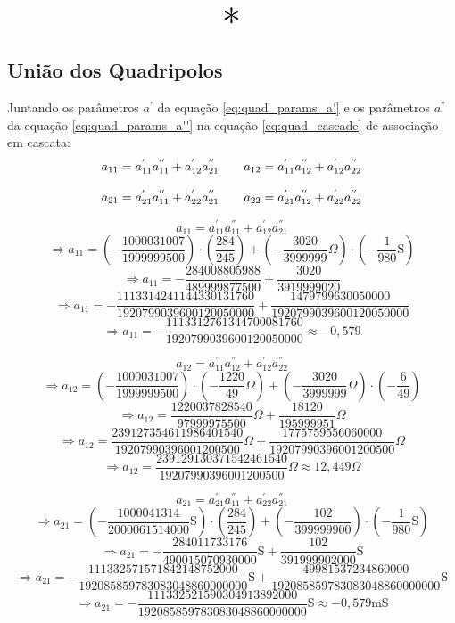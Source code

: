 \documentclass{report}
\begin{document}
\begin{center}
    \[ \scalebox{3}{$ * $} \]
\end{center}

\subsection{União dos Quadripolos}

Juntando os parâmetros $ a^{'} $ da equação \ref{eq:quad_params_a'} e os parâmetros $ a^{''} $ da equação \ref{eq:quad_params_a''} na equação \ref{eq:quad_cascade} de
associação em cascata:
\begin{equation}
  \label{eq:bad}
  \centering
  \begin{matrix}
    a_{11} = a^{'}_{11}a^{''}_{11} + a^{'}_{12}a^{''}_{21} & \hspace{10pt} a_{12} = a^{'}_{11}a^{''}_{12} + a^{'}_{12}a^{''}_{22} \\\\
    a_{21} = a^{'}_{21}a^{''}_{11} + a^{'}_{22}a^{''}_{21} & \hspace{10pt} a_{22} = a^{'}_{21}a^{''}_{12} + a^{'}_{22}a^{''}_{22}
  \end{matrix}
\end{equation}

$$ a_{11} = a^{'}_{11}a^{''}_{11} + a^{'}_{12}a^{''}_{21} $$
$$ \Rightarrow a_{11} = \left(- \frac{1000031007}{1999999500}\right) \cdot \left(\frac{284}{245}\right) + \left(- \frac{3020}{3999999} \Omega\right) \cdot \left(- \frac{1}{980}\text{S}\right) $$
$$ \Rightarrow a_{11} = - \frac{284008805988}{489999877500} + \frac{3020}{3919999020} $$
$$ \Rightarrow a_{11} = - \frac{1113314241144330131760}{1920799039600120050000} + \frac{1479799630050000}{1920799039600120050000} $$
$$ \Rightarrow a_{11} = - \frac{1113312761344700081760}{1920799039600120050000} \approx -0,\!579 $$

$$ a_{12} = a^{'}_{11}a^{''}_{12} + a^{'}_{12}a^{''}_{22} $$
$$ \Rightarrow a_{12} = \left(- \frac{1000031007}{1999999500}\right) \cdot \left(- \frac{1220}{49} \Omega\right) + \left(- \frac{3020}{3999999} \Omega\right) \cdot \left(- \frac{6}{49}\right) $$
$$ \Rightarrow a_{12} = \frac{1220037828540}{97999975500} \Omega + \frac{18120}{195999951} \Omega $$
$$ \Rightarrow a_{12} = \frac{239127354611986401540}{19207990396001200500} \Omega + \frac{1775759556060000}{19207990396001200500} \Omega $$
$$ \Rightarrow a_{12} = \frac{239129130371542461540}{19207990396001200500} \Omega \approx 12,\!449 \Omega $$

$$ a_{21} = a^{'}_{21}a^{''}_{11} + a^{'}_{22}a^{''}_{21} $$
$$ \Rightarrow a_{21} = \left(- \frac{1000041314}{2000061514000} \text{S}\right) \cdot \left(\frac{284}{245}\right) + \left(- \frac{102}{399999900}\right) \cdot \left(- \frac{1}{980}\text{S}\right) $$
$$ \Rightarrow a_{21} = - \frac{284011733176}{490015070930000} \text{S} + \frac{102}{391999902000}\text{S} $$
$$ \Rightarrow a_{21} = - \frac{111332571571842148752000}{192085859783083048860000000} \text{S} + \frac{49981537234860000}{192085859783083048860000000}\text{S} $$
$$ \Rightarrow a_{21} = - \frac{111332521590304913892000}{192085859783083048860000000} \text{S} \approx - 0,\!579 \text{mS} $$
\end{document}
